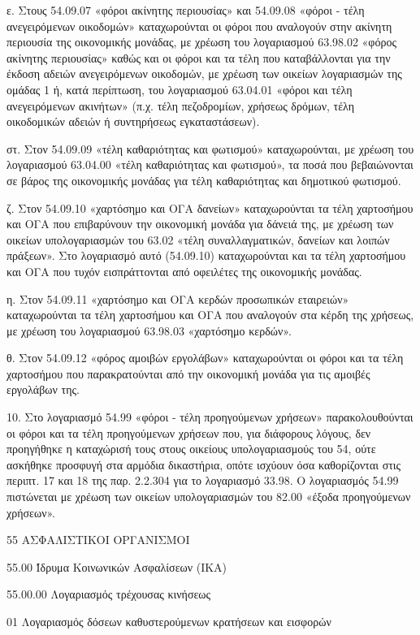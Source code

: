 \documentclass[A4,10pt,greek]{book}
\begin{document}
ε. Στους 54.09.07 «φόροι ακίνητης περιουσίας» και 54.09.08 «φόροι - τέλη ανεγειρόμενων οικοδομών» καταχωρούνται οι φόροι που αναλογούν στην ακίνητη περιουσία της οικονομικής μονάδας, με χρέωση του λογαριασμού 63.98.02 «φόρος ακίνητης περιουσίας» καθώς και οι φόροι και τα τέλη που καταβάλλονται για την έκδοση αδειών ανεγειρόμενων οικοδομών, με χρέωση των οικείων λογαριασμών της ομάδας 1 ή, κατά περίπτωση, του λογαριασμού 63.04.01 «φόροι και τέλη ανεγειρόμενων ακινήτων» (π.χ. τέλη πεζοδρομίων, χρήσεως δρόμων, τέλη οικοδομικών αδειών ή συντηρήσεως εγκαταστάσεων).

στ. Στον 54.09.09 «τέλη καθαριότητας και φωτισμού» καταχωρούνται, με χρέωση του λογαριασμού 63.04.00 «τέλη καθαριότητας και φωτισμού», τα ποσά που βεβαιώνονται σε βάρος της οικονομικής μονάδας για τέλη καθαριότητας και δημοτικού φωτισμού.

ζ. Στον 54.09.10 «χαρτόσημο και ΟΓΑ δανείων» καταχωρούνται τα τέλη χαρτοσήμου και ΟΓΑ που επιβαρύνουν την οικονομική μονάδα για δάνειά της, με χρέωση των οικείων υπολογαριασμών του 63.02 «τέλη συναλλαγματικών, δανείων και λοιπών πράξεων». Στο λογαριασμό αυτό (54.09.10) καταχωρούνται και τα τέλη χαρτοσήμου και ΟΓΑ που τυχόν εισπράττονται από οφειλέτες της οικονομικής μονάδας.

η. Στον 54.09.11 «χαρτόσημο και ΟΓΑ κερδών προσωπικών εταιρειών» καταχωρούνται τα τέλη χαρτοσήμου και ΟΓΑ που αναλογούν στα κέρδη της χρήσεως, με χρέωση του λογαριασμού 63.98.03 «χαρτόσημο κερδών».

θ. Στον 54.09.12 «φόρος αμοιβών εργολάβων» καταχωρούνται οι φόροι και τα τέλη χαρτοσήμου που παρακρατούνται από την οικονομική μονάδα για τις αμοιβές εργολάβων της.

10. Στο λογαριασμό 54.99 «φόροι - τέλη προηγούμενων χρήσεων» παρακολουθούνται οι φόροι και τα τέλη προηγούμενων χρήσεων που, για διάφορους λόγους, δεν προηγήθηκε η καταχώρισή τους στους οικείους υπολογαριασμούς του 54, ούτε ασκήθηκε προσφυγή στα αρμόδια δικαστήρια, οπότε ισχύουν όσα καθορίζονται στις περιπτ. 17 και 18 της παρ. 2.2.304 για το λογαριασμό 33.98. Ο λογαριασμός 54.99 πιστώνεται με χρέωση των οικείων υπολογαριασμών του 82.00 «έξοδα προηγούμενων χρήσεων».

 55   ΑΣΦΑΛΙΣΤΙΚΟΙ ΟΡΓΑΝΙΣΜΟΙ

        55.00   Ίδρυμα Κοινωνικών Ασφαλίσεων (ΙΚΑ)

                    55.00.00   Λογαριασμός τρέχουσας κινήσεως

                               01   Λογαριασμός δόσεων καθυστερούμενων κρατήσεων
                                      και εισφορών
\end{document}
